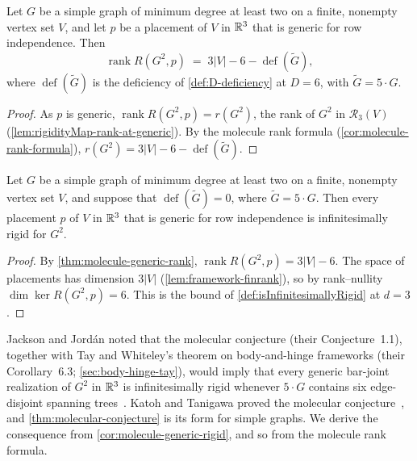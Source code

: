 \begin{theorem}
  \label{thm:molecule-generic-rank}
  \leanok
  Let $G$ be a simple graph of minimum degree at least two on a
  finite, nonempty vertex set $V$, and let $p$ be a placement of $V$ in
  ${\mathbb{R}}^3$ that is generic for row independence. Then
  \[
    \operatorname{rank} R(G^2, p)
      \;=\; 3|V| - 6 - \operatorname{def}(\tilde G),
  \]
  where $\operatorname{def}(\tilde G)$ is the deficiency of
  \cref{def:D-deficiency} at $D = 6$, with $\tilde G = 5 \cdot G$.
\end{theorem}
\begin{proof}
  \leanok
  As $p$ is generic, $\operatorname{rank} R(G^2, p) = r(G^2)$, the rank
  of $G^2$ in $\mathcal{R}_3(V)$
  (\cref{lem:rigidityMap-rank-at-generic}). By the molecule rank
  formula (\cref{cor:molecule-rank-formula}),
  $r(G^2) = 3|V| - 6 - \operatorname{def}(\tilde G)$.
\end{proof}

\begin{corollary}
  \label{cor:molecule-generic-rigid}
  \leanok
  Let $G$ be a simple graph of minimum degree at least two on a
  finite, nonempty vertex set $V$, and suppose that
  $\operatorname{def}(\tilde G) = 0$, where $\tilde G = 5 \cdot G$.
  Then every placement $p$ of $V$ in ${\mathbb{R}}^3$ that is generic for row
  independence is infinitesimally rigid for $G^2$.
\end{corollary}
\begin{proof}
  \leanok
  By \cref{thm:molecule-generic-rank},
  $\operatorname{rank} R(G^2, p) = 3|V| - 6$. The space of placements
  has dimension $3|V|$ (\cref{lem:framework-finrank}), so by
  rank--nullity $\dim \ker R(G^2, p) = 6$. This is the bound of
  \cref{def:isInfinitesimallyRigid} at $d = 3$.
\end{proof}

Jackson and Jord\'an noted that the molecular conjecture (their
Conjecture~1.1), together with Tay and Whiteley's theorem on
body-and-hinge frameworks (their Corollary~6.3;
\cref{sec:body-hinge-tay}), would imply that every generic bar-joint
realization of $G^2$ in ${\mathbb{R}}^3$ is infinitesimally rigid whenever
$5 \cdot G$ contains six edge-disjoint spanning
trees~\cite[p.~586]{jacksonJordan2009}. Katoh and Tanigawa proved the
molecular conjecture~\cite{katohTanigawa2011}, and
\cref{thm:molecular-conjecture} is its form for simple graphs. We
derive the consequence from \cref{cor:molecule-generic-rigid}, and so
from the molecule rank formula.

